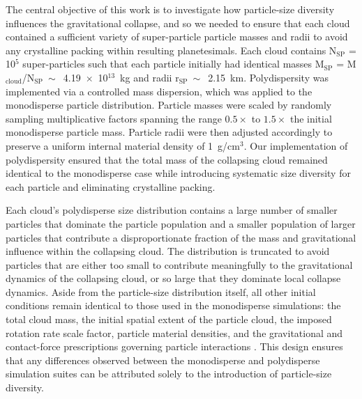 \documentclass[fleqn,usenatbib]{mnras}
\begin{document}
The central objective of this work is to investigate how particle-size diversity influences the gravitational collapse, and so we needed to ensure that each cloud contained a sufficient variety of super-particle particle masses and radii to avoid any crystalline packing within resulting planetesimals.
Each cloud contains N$_{\text{SP}}$ = 10$^5$ super-particles such that each particle initially had identical masses M$_{\text{SP}}$ = M$_{\text{cloud}}$/N$_{\text{SP}}~\sim$~4.19~$\times$~10$^{13}$~kg and radii r$_{\text{SP}}~\sim$~2.15~km.
Polydispersity was implemented via a controlled mass dispersion, which was applied to the monodisperse particle distribution. 
Particle masses were scaled by randomly sampling multiplicative factors spanning the range $0.5\times$ to $1.5\times$ the initial monodisperse particle mass. 
Particle radii were then adjusted accordingly to preserve a uniform internal material density of 1~g/cm$^3$. 
Our implementation of polydispersity ensured that the total mass of the collapsing cloud remained identical to the monodisperse case while introducing systematic size diversity for each particle and eliminating crystalline packing.

Each cloud's polydisperse size distribution contains a large number of smaller particles that dominate the particle population and a smaller population of larger particles that contribute a disproportionate fraction of the mass and gravitational influence within the collapsing cloud. 
The distribution is truncated to avoid particles that are either too small to contribute meaningfully to the gravitational dynamics of the collapsing cloud, or so large that they dominate local collapse dynamics.
Aside from the particle-size distribution itself, all other initial conditions remain identical to those used in the monodisperse simulations: the total cloud mass, the initial spatial extent of the particle cloud, the imposed rotation rate scale factor, particle material densities, and the gravitational and contact-force prescriptions governing particle interactions \citep[as described in][]{Barnes2025}.
This design ensures that any differences observed between the monodisperse and polydisperse simulation suites can be attributed solely to the introduction of particle-size diversity.
\end{document}
